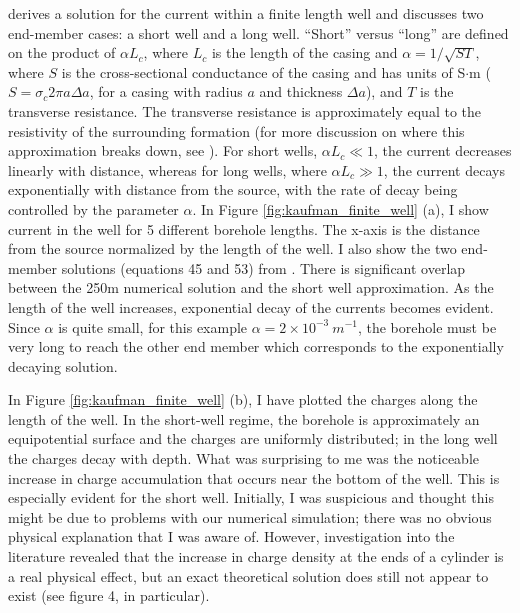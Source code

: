 \cite{Kaufman1993} derives a solution for the current within a finite length well and discusses two end-member cases: a short well and a long well. ``Short'' versus ``long'' are defined on the product of $\alpha L_c$, where $L_c$ is the length of the casing and $\alpha = 1/\sqrt{S T}$, where $S$ is the cross-sectional conductance of the casing and has units of S$\cdot$m ($S = \sigma_c 2\pi a \Delta a$, for a casing with radius $a$ and thickness $\Delta a$), and $T$ is the transverse resistance. The transverse resistance is approximately equal to the resistivity of the surrounding formation (for more discussion on where this approximation breaks down, see \cite{Schenkel1994}). For short wells, $\alpha L_c \ll 1$, the current decreases linearly with distance, whereas for long wells, where $\alpha L_c \gg 1$, the current decays exponentially with distance from the source, with the rate of decay being controlled by the parameter $\alpha$. In Figure \ref{fig:kaufman_finite_well} (a), I show current in the well for 5 different borehole lengths. The x-axis is the distance from the source normalized by the length of the well. I also show the two end-member solutions (equations 45 and 53) from \cite{Kaufman1993}. There is significant overlap between the 250m numerical solution and the short well approximation. As the length of the well increases, exponential decay of the currents becomes evident. Since $\alpha$ is quite small, for this example $\alpha = 2 \times 10^{-3} ~ m^{-1}$, the borehole must be very long to reach the other end member which corresponds to the exponentially decaying solution.




In Figure \ref{fig:kaufman_finite_well} (b), I have plotted the charges along the length of the well. In the short-well regime, the borehole is approximately an equipotential surface and the charges are uniformly distributed; in the long well the charges decay with depth. What was surprising to me was the noticeable increase in charge accumulation that occurs near the bottom of the well. This is especially evident for the short well. Initially, I was suspicious and thought this might be due to problems with our numerical simulation; there was no obvious physical explanation that I was aware of. However, investigation into the literature revealed that the increase in charge density at the ends of a cylinder is a real physical effect, but an exact theoretical solution does still not appear to exist \citep{Griffiths1997} (see figure 4, in particular).

